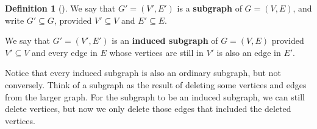 \documentclass[10pt,]{book}
\newcommand{\terminology}[1]{\textbf{#1}}
\theoremstyle{plain}
\theoremstyle{definition}
\newtheorem{definition}[theorem]{Definition}
\theoremstyle{definition}
\theoremstyle{definition}
\numberwithin{equation}{chapter}
\begin{document}
\begin{definition}[{}]\label{definition-5}
\hypertarget{p-1318}{}%
We say that \(G' = (V', E')\) is a \terminology{subgraph} of \(G = (V, E)\), and write \(G' \subseteq G\), provided \(V' \subseteq V\) and \(E' \subseteq E\).%
\par
\hypertarget{p-1319}{}%
We say that \(G' = (V', E')\) is an \terminology{induced subgraph} of \(G = (V, E)\) provided \(V' \subseteq V\) and every edge in \(E\) whose vertices are still in \(V'\) is also an edge in \(E'\).%
\end{definition}
\hypertarget{p-1320}{}%
Notice that every induced subgraph is also an ordinary subgraph, but not conversely.  Think of a subgraph as the result of deleting some vertices and edges from the larger graph.  For the subgraph to be an induced subgraph, we can still delete vertices, but now we only delete those edges that included the deleted vertices.%
\end{document}
